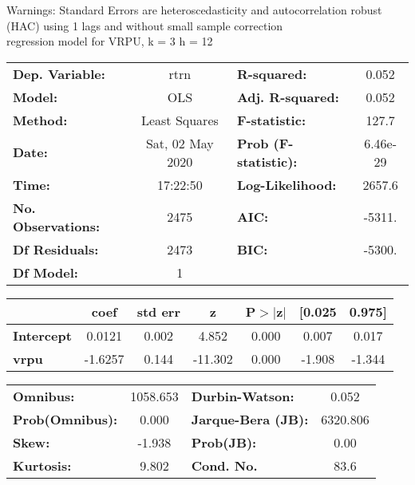 Warnings: \newline
 [1] Standard Errors are heteroscedasticity and autocorrelation robust (HAC) using 1 lags and without small sample correction\\ 

regression model for VRPU, k = 3 h = 12\begin{center}
\begin{tabular}{lclc}
\toprule
\textbf{Dep. Variable:}    &       rtrn       & \textbf{  R-squared:         } &     0.052   \\
\textbf{Model:}            &       OLS        & \textbf{  Adj. R-squared:    } &     0.052   \\
\textbf{Method:}           &  Least Squares   & \textbf{  F-statistic:       } &     127.7   \\
\textbf{Date:}             & Sat, 02 May 2020 & \textbf{  Prob (F-statistic):} &  6.46e-29   \\
\textbf{Time:}             &     17:22:50     & \textbf{  Log-Likelihood:    } &    2657.6   \\
\textbf{No. Observations:} &        2475      & \textbf{  AIC:               } &    -5311.   \\
\textbf{Df Residuals:}     &        2473      & \textbf{  BIC:               } &    -5300.   \\
\textbf{Df Model:}         &           1      & \textbf{                     } &             \\
\bottomrule
\end{tabular}
\begin{tabular}{lcccccc}
                   & \textbf{coef} & \textbf{std err} & \textbf{z} & \textbf{P$> |$z$|$} & \textbf{[0.025} & \textbf{0.975]}  \\
\midrule
\textbf{Intercept} &       0.0121  &        0.002     &     4.852  &         0.000        &        0.007    &        0.017     \\
\textbf{vrpu}      &      -1.6257  &        0.144     &   -11.302  &         0.000        &       -1.908    &       -1.344     \\
\bottomrule
\end{tabular}
\begin{tabular}{lclc}
\textbf{Omnibus:}       & 1058.653 & \textbf{  Durbin-Watson:     } &    0.052  \\
\textbf{Prob(Omnibus):} &   0.000  & \textbf{  Jarque-Bera (JB):  } & 6320.806  \\
\textbf{Skew:}          &  -1.938  & \textbf{  Prob(JB):          } &     0.00  \\
\textbf{Kurtosis:}      &   9.802  & \textbf{  Cond. No.          } &     83.6  \\
\bottomrule
\end{tabular}
\end{center}

